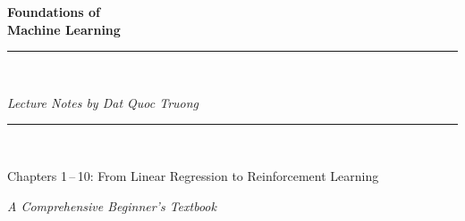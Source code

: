 \documentclass[11pt,a4paper,oneside]{book}
\theoremstyle{definition}
\theoremstyle{plain}
\begin{document}

\begin{titlepage}
\centering
\vspace*{2.5cm}
{\fontsize{40}{48}\selectfont\bfseries Foundations of\\[0.3em]
Machine Learning\par}
\vspace{1.2cm}
\rule{0.55\textwidth}{0.8pt}\\[0.9em]
{\Large\itshape Lecture Notes by Dat Quoc Truong\par}
\vspace{0.9cm}
\rule{0.55\textwidth}{0.4pt}\\[1.2em]
{\large Chapters 1\,--\,10: From Linear Regression to
Reinforcement Learning\par}
\vfill
{\normalsize\itshape A Comprehensive Beginner's Textbook\par}
\vspace{1.5cm}
\end{titlepage}

\cleardoublepage

\tableofcontents
\clearpage











\end{document}
